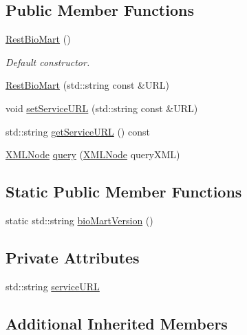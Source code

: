 \subsection*{Public Member Functions}
\begin{DoxyCompactItemize}
\item 
\hyperlink{classunisys_1_1RestBioMart_a879cc7ef59227beaffb402bbd0ed9410}{Rest\-Bio\-Mart} ()
\begin{DoxyCompactList}\small\item\em Default constructor. \end{DoxyCompactList}\item 
\hyperlink{classunisys_1_1RestBioMart_a1f5073b05a658b9db3e485e3bbb42a18}{Rest\-Bio\-Mart} (std\-::string const \&U\-R\-L)
\item 
void \hyperlink{classunisys_1_1RestBioMart_ac44ca5bcc66ac9243ebc8b9baa549755}{set\-Service\-U\-R\-L} (std\-::string const \&U\-R\-L)
\item 
std\-::string \hyperlink{classunisys_1_1RestBioMart_aa4a36ec1a2c080f89d184e60b594b0d7}{get\-Service\-U\-R\-L} () const 
\item 
\hyperlink{structXMLNode}{X\-M\-L\-Node} \hyperlink{classunisys_1_1RestBioMart_acf74fb7027a8ba682ac8aee99a6b9f6b}{query} (\hyperlink{structXMLNode}{X\-M\-L\-Node} query\-X\-M\-L)
\end{DoxyCompactItemize}
\subsection*{Static Public Member Functions}
\begin{DoxyCompactItemize}
\item 
static std\-::string \hyperlink{classunisys_1_1RestBioMart_a41481980c6f8a8e5c08953cdc81571bf}{bio\-Mart\-Version} ()
\end{DoxyCompactItemize}
\subsection*{Private Attributes}
\begin{DoxyCompactItemize}
\item 
std\-::string \hyperlink{classunisys_1_1RestBioMart_a039ca4ffbab767d66d85c5e5297948f4}{service\-U\-R\-L}
\end{DoxyCompactItemize}
\subsection*{Additional Inherited Members}


